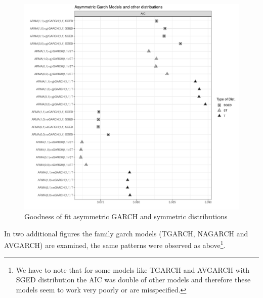 \documentclass[a4paper, nobind]{templates/ociamthesis}
\newcommand*{\bibtitle}{Works Cited}
\begin{document}
\begin{figure}[h]

{\centering \includegraphics[width=1\linewidth]{figures/aicfigures/asymmetric aics2} 

}

\caption{Goodness of fit asymmetric GARCH and symmetric distributions}\label{fig:aic4}
\end{figure}

\noindent In two additional figures the family garch models (TGARCH, NAGARCH and AVGARCH) are examined, the same patterns were observed as above\footnote{We have to note that for some models like TGARCH and AVGARCH with SGED distribution the AIC was double of other models and therefore these models seem to work very poorly or are misspecified.}.




\setlength{\baselineskip}{0pt} %

{\renewcommand*\MakeUppercase[1]{#1}%
\printbibliography[heading=bibintoc,title={\bibtitle}]}
\end{document}
